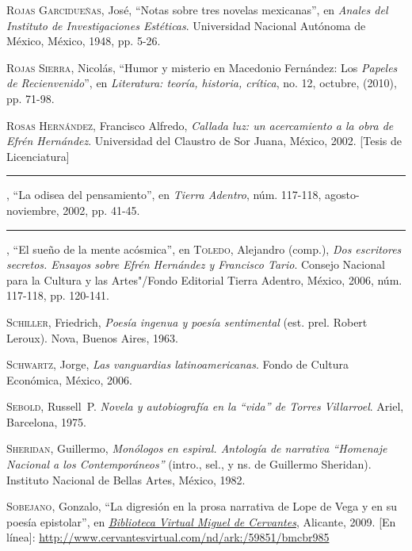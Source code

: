 \documentclass[14pt,twoside,final]{extbook} %
\begin{document}
\textsc{Rojas Garcidueñas}, José, ``Notas sobre tres novelas mexicanas'', en \emph{Anales del Instituto de Investigaciones Estéticas}. Universidad Nacional Autónoma de México, México, 1948, pp. 5-26.\label{bib:rojas1948}

\textsc{Rojas Sierra}, Nicolás, ``Humor y misterio en Macedonio Fernández: Los \emph{Papeles de Recienvenido}'', en \emph{Literatura: teoría, historia, crítica}, no. 12, octubre, (2010), pp. 71-98.\label{bib:rojas2010}

\textsc{Rosas Hernández}, Francisco Alfredo, \emph{Callada luz: un acercamiento a la obra de Efrén Hernández}. Universidad del Claustro de Sor Juana, México, 2002. [Tesis de Licenciatura]\label{bib:rosas2002a}

\rule{1cm}{0.4pt}, ``La odisea del pensamiento'', en \emph{Tierra Adentro}, núm. 117-118, agosto-noviembre, 2002, pp. 41-45.\label{bib:rosas2002b}

\rule{1cm}{0.4pt}, ``El sueño de la mente acósmica'', en \textsc{Toledo}, Alejandro (comp.), \emph{Dos escritores secretos. Ensayos sobre Efrén Hernández y Francisco Tario}. Consejo Nacional para la Cultura y las Artes"/Fondo Editorial Tierra Adentro, México, 2006, núm. 117-118, pp. 120-141.\label{bib:rosas2006}

\textsc{Schiller}, Friedrich, \emph{Poesía ingenua y poesía sentimental} (est. prel. Robert Leroux). Nova, Buenos Aires, 1963.\label{bib:schiller1963}

\textsc{Schwartz}, Jorge, \emph{Las vanguardias latinoamericanas}. Fondo de Cultura Económica, México, 2006.\label{bib:schwartz2006}

\textsc{Sebold}, Russell~P. \emph{Novela y autobiografía en la ``vida'' de Torres Villarroel}. Ariel, Barcelona, 1975.\label{bib:sebold1975}

\textsc{Sheridan}, Guillermo, \emph{Monólogos en espiral. Antología de narrativa ``Homenaje Nacional a los \emph{Contemporáneos}''} (intro., sel., y ns. de Guillermo Sheridan). Instituto Nacional de Bellas Artes, México, 1982.\label{bib:sheridan1982}

\textsc{Sobejano}, Gonzalo, ``La digresión en la prosa narrativa de Lope de Vega y en su poesía epistolar'', en \href{http://www.cervantesvirtual.com/}{\emph{Biblioteca Virtual Miguel de Cervantes}}, Alicante, 2009. [En línea]: \url{http://www.cervantesvirtual.com/nd/ark:/59851/bmcbr985}\label{bib:sobejano2009}
\end{document}
